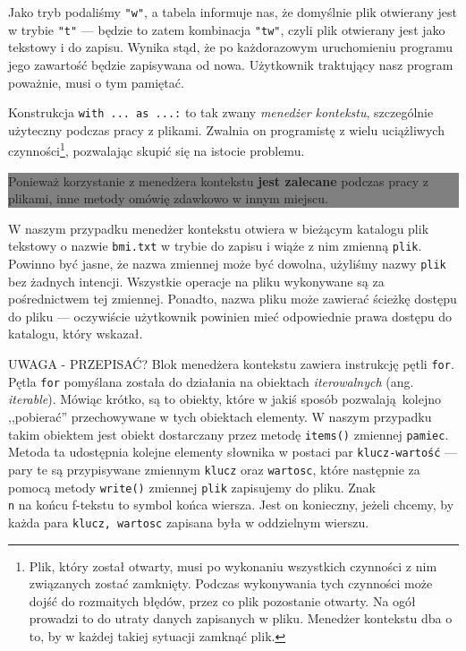 \documentclass[a4paper]{article}
\newcommand{\important}[1]{
    \begin{center}\colorbox{gray}{
        \begin{minipage}[t]{0.9\textwidth}{#1}
        \end{minipage}
    }
    \end{center}
}
\begin{document}
Jako tryb podaliśmy \texttt{"w"}, a tabela informuje nas, że domyślnie plik otwierany jest w trybie \texttt{"t"} --- będzie to zatem kombinacja \texttt{"tw"}, czyli plik otwierany jest jako tekstowy i do zapisu. Wynika stąd, że po każdorazowym uruchomieniu programu jego zawartość będzie zapisywana od nowa. Użytkownik traktujący nasz program poważnie, musi o tym pamiętać.

Konstrukcja \lstinline|with ... as ...:| to tak zwany \emph{menedżer kontekstu}, szczególnie użyteczny podczas pracy z plikami. Zwalnia on programistę z wielu uciążliwych czynności\footnote{Plik, który został otwarty, musi po wykonaniu wszystkich czynności z nim związanych zostać zamknięty. Podczas wykonywania tych czynności może dojść do rozmaitych błędów, przez co plik pozostanie otwarty. Na ogół prowadzi to do utraty danych zapisanych w pliku. Menedżer kontekstu dba o to, by w każdej takiej sytuacji zamknąć plik.}, pozwalając skupić się na istocie problemu.

\important{Ponieważ korzystanie z menedżera kontekstu \textbf{jest zalecane} podczas pracy z plikami, inne metody omówię zdawkowo w innym miejscu.}

W naszym przypadku menedżer kontekstu otwiera w bieżącym katalogu plik tekstowy o nazwie \texttt{bmi.txt} w trybie do zapisu i wiąże z nim zmienną \texttt{plik}. Powinno być jasne, że nazwa zmiennej może być dowolna, użyliśmy nazwy \texttt{plik} bez żadnych intencji. Wszystkie operacje na pliku wykonywane są za pośrednictwem tej zmiennej. Ponadto, nazwa pliku może zawierać ścieżkę dostępu do pliku --- oczywiście użytkownik powinien mieć odpowiednie prawa dostępu do katalogu, który wskazał.

UWAGA - PRZEPISAĆ?
Blok menedżera kontekstu zawiera instrukcję pętli \lstinline|for|. Pętla \lstinline|for| pomyślana została do działania na obiektach \emph{iterowalnych} (ang. \emph{iterable}). Mówiąc krótko, są to obiekty, które w jakiś sposób pozwalają kolejno ,,pobierać'' przechowywane w tych obiektach elementy. W naszym przypadku takim obiektem jest obiekt dostarczany przez metodę \lstinline|items()| zmiennej \texttt{pamiec}. Metoda ta udostępnia kolejne elementy słownika w postaci par \texttt{klucz-wartość} --- pary te są przypisywane zmiennym \texttt{klucz} oraz \texttt{wartosc}, które następnie za pomocą metody \lstinline|write()| zmiennej \texttt{plik} zapisujemy do pliku. Znak \texttt{\\n} na końcu f-tekstu to symbol końca wiersza. Jest on konieczny, jeżeli chcemy, by każda para \texttt{klucz, wartosc} zapisana była w oddzielnym wierszu.
\end{document}

